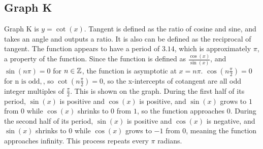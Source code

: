 \subsection{Graph K}

Graph K is ${y=\cot(x)}$.
Tangent is defined as the ratio of cosine and sine, and takes an angle and outputs a ratio.
It is also can be defined as the reciprocal of tangent.
The function appears to have a period of $3.14$, which is approximately $\pi$, a property of the function.
Since the function is defined as ${\frac{\cos(x)}{\sin(x)}}$, and ${\sin(n\pi)=0}$ for ${n \in \mathbb{Z}}$, the function is asymptotic at ${x=n\pi}$.
${\cos(n\frac{\pi}{2})=0}$ for ${\text{n is odd}, }$, so ${\cot(n\frac{\pi}{2})=0}$, so the x-intercepts of cotangent are all odd integer multiples of ${\frac{\pi}{2}}$.
This is shown on the graph.
During the first half of its period, ${\sin(x)}$ is positive and ${\cos(x)}$ is positive, and ${\sin(x)}$ grows to $1$ from $0$ while ${\cos(x)}$ shrinks to $0$ from $1$, so the function approaches $0$.
During the second half of its period, ${\sin(x)}$ is positive and ${\cos(x)}$ is negative, and ${\sin(x)}$ shrinks to $0$ while ${\cos(x)}$ grows to $-1$ from $0$, meaning the function approaches infinity.
This process repeats every $\pi$ radians.
